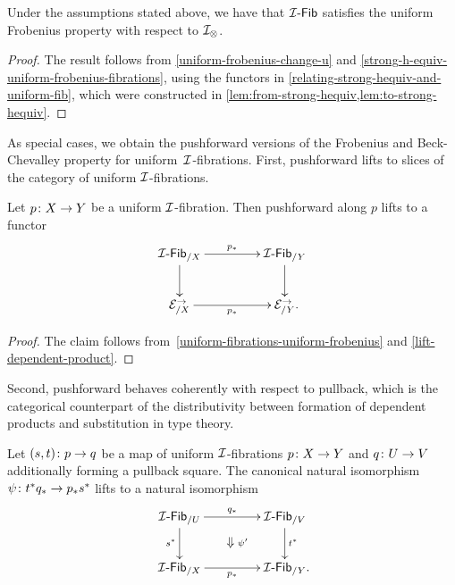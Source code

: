 \documentclass[reqno,10pt,a4paper,oneside,draft]{amsart}
\begin{document}
\begin{theorem} \label{uniform-fibrations-uniform-frobenius}
Under the assumptions stated above, we have that $\Fib{\cal{I}} $ satisfies the uniform Frobenius property with respect to $\cal{I}_{\otimes}$.
\end{theorem}

\begin{proof}
The result follows from \cref{uniform-frobenius-change-u} and \cref{strong-h-equiv-uniform-frobenius-fibrations}, using the functors in \cref{relating-strong-hequiv-and-uniform-fib}, which were constructed in \cref{lem:from-strong-hequiv,lem:to-strong-hequiv}.
\end{proof}

As special cases, we obtain the pushforward versions of the Frobenius and Beck-Chevalley property for uniform~$\cal{I}$-fibrations.
First, pushforward lifts to slices of the category of uniform $\cal{I}$-fibrations.

\begin{corollary} \label{uniform-fibrations-frobenius-pushforward}
Let $p \co X \to Y$ be a uniform $\cal{I}$-fibration.
Then pushforward along $p$ lifts to a functor
\[
\xymatrix@C+2em{
  \Fib{\cal{I}}_{/X}
  \ar[r]^{p_*}
  \ar[d]
&
  \Fib{\cal{I}}_{/Y}
  \ar[d]
\\
  \catE_{/X}^\to
  \ar[r]_{p_*}
&
  \catE_{/Y}^\to
\rlap{.}}
\]
\end{corollary}

\begin{proof}
The claim follows from~\cref{uniform-fibrations-uniform-frobenius} and \cref{lift-dependent-product}.
\end{proof}

Second, pushforward behaves coherently with respect to pullback, which is the categorical counterpart of the distributivity between formation of dependent products and substitution in type theory.

\begin{corollary} \label{uniform-fibrations-BC-pushforward}
Let $(s, t) \co p \to q$ be a map of uniform $\cal{I}$-fibrations $p \co X \to Y$ and $q \co U \to V$ additionally forming a pullback square.
The canonical natural isomorphism $\psi \co t^* q_* \to p_* s^*$ lifts to a natural isomorphism
\[
\xymatrix@C+2em{
  \Fib{\cal{I}}_{/U}
  \ar[r]^{q_*}
  \ar[d]_{s^*}
  \ar@{}[dr]|{\textstyle\Downarrow \rlap{$\labelstyle \psi'$}}
&
  \Fib{\cal{I}}_{/V}
  \ar[d]^{t^*}
\\
  \Fib{\cal{I}}_{/X}
  \ar[r]_{p_*}
&
  \Fib{\cal{I}}_{/Y}
\rlap{.}}
\]
\end{corollary}
\end{document}
